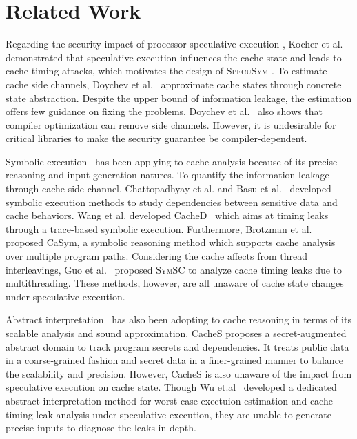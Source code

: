 \documentclass[sigconf, review]{acmart}
\newcommand\ignore[1]{}
\newcommand{\SpecuSym}{\textsc{SpecuSym} }
\begin{document}
\ignore{
In this work, we are concerned with \emph{detecting leaks} only as
opposed to \emph{constructing attacks} or \emph{quantifying the
  difficulty in constructing attacks}.  Nevertheless, the latter may
be addressed by conducting a quantitative version of our analysis,
e.g., by verifying $\forall k_1,k_2~.~|\tau(k_1)-\tau(k_2)|\leq
\Delta$ instead of $\forall k_1,k_2~.~\tau(k_1) = \tau(k_2)$.
However, we leave this for future work.
}


\section{Related Work}
\label{sec:related}

Regarding the security impact of processor speculative execution
\cite{kimuraKT1996}, Kocher et al.~\cite{KocherGGHHLMPSY19} demonstrated 
that speculative execution influences the cache state and leads to cache 
timing attacks, which motivates the design of \SpecuSym. 
%
To estimate cache side channels, Doychev et al.~\cite{DoychevFKMR13}
approximate cache states through concrete state abstraction. Despite the
upper bound of information leakage, the estimation offers few guidance on 
fixing the problems. Doychev et al.~\cite{DoychevK17} also shows that 
compiler optimization can remove side channels. However, it is undesirable 
for critical libraries to make the security guarantee be compiler-dependent. 

Symbolic execution~\cite{King76} has been applying to cache analysis because
of its precise reasoning and input generation natures. To quantify the 
information leakage through cache side channel, Chattopadhyay et al.
\cite{ChattopadhyayBRZ17,Chattopadhyay17} and Basu et al.~\cite{BasuC17}
developed symbolic execution methods to study dependencies between sensitive 
data and cache behaviors. Wang et al. developed CacheD~\cite{WangWLZW17} which 
aims at timing leaks through a trace-based symbolic execution. Furthermore, 
Brotzman et al.~\cite{BrotzmanLZTK2018} proposed CaSym, a symbolic reasoning 
method which supports cache analysis over multiple program paths. Considering
the cache affects from thread interleavings, Guo et al.~\cite{GuoWW18} proposed
\textsc{SymSC} to analyze cache timing leaks due to multithreading. These methods,
however, are all unaware of cache state changes under speculative execution.  


Abstract interpretation~\cite{CousotC77} has also been adopting to cache 
reasoning in terms of its scalable analysis and sound approximation. CacheS
\cite{CacheS} proposes a secret-augmented abstract domain to track program 
secrets and dependencies. It treats public data in a coarse-grained fashion 
and secret data in a finer-grained manner to balance the scalability and 
precision. However, CacheS is also unaware of the impact from speculative 
execution on cache state. Though Wu et.al~\cite{WuW19} developed a dedicated 
abstract interpretation method for worst case exectuion estimation and cache 
timing leak analysis under speculative execution, they are unable to generate 
precise inputs to diagnose the leaks in depth. 
\end{document}
